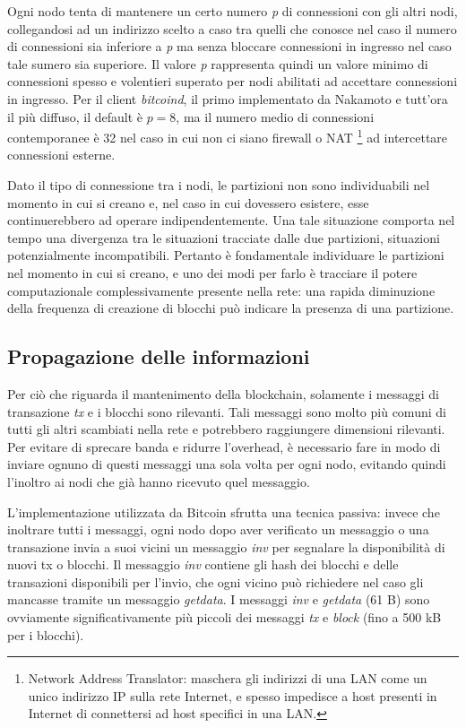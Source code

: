 Ogni nodo tenta di mantenere un certo numero \emph{p} di connessioni con gli altri nodi, collegandosi ad un indirizzo scelto a caso tra quelli che conosce nel caso il numero di connessioni sia inferiore a \emph{p} ma senza bloccare connessioni in ingresso nel caso tale sumero sia superiore. Il valore \emph{p} rappresenta quindi un valore minimo di connessioni spesso e volentieri superato per nodi abilitati ad accettare connessioni in ingresso. Per il client \emph{bitcoind}, il primo implementato da Nakamoto e tutt'ora il più diffuso, il default è $p=8$, ma il numero medio di connessioni contemporanee è 32 nel caso in cui non ci siano firewall o NAT \footnote{Network Address Translator: maschera   gli indirizzi di una LAN come un unico indirizzo IP sulla rete   Internet, e spesso impedisce a host presenti in Internet di   connettersi ad host specifici in una LAN.} ad intercettare connessioni esterne.

Dato il tipo di connessione tra i nodi, le partizioni non sono individuabili nel momento in cui si creano e, nel caso in cui dovessero esistere, esse continuerebbero ad operare indipendentemente. Una tale situazione comporta nel tempo una divergenza tra le situazioni tracciate dalle due partizioni, situazioni potenzialmente incompatibili. Pertanto è fondamentale individuare le partizioni nel momento in cui si creano, e uno dei modi per farlo è tracciare il potere computazionale complessivamente presente nella rete: una rapida diminuzione della frequenza di creazione di blocchi può indicare la presenza di una partizione.

\subsection{Propagazione delle informazioni}\label{propagazione-delle-informazioni}

Per ciò che riguarda il mantenimento della blockchain, solamente i messaggi di transazione \emph{tx} e i blocchi sono rilevanti. Tali messaggi sono molto più comuni di tutti gli altri scambiati nella rete e potrebbero raggiungere dimensioni rilevanti. Per evitare di sprecare banda e ridurre l'overhead, è necessario fare in modo di inviare ognuno di questi messaggi una sola volta per ogni nodo, evitando quindi l'inoltro ai nodi che già hanno ricevuto quel messaggio.

L'implementazione utilizzata da Bitcoin sfrutta una tecnica passiva: invece che inoltrare tutti i messaggi, ogni nodo dopo aver verificato un messaggio o una transazione invia a suoi vicini un messaggio \emph{inv} per segnalare la disponibilità di nuovi tx o blocchi. Il messaggio \emph{inv} contiene gli hash dei blocchi e delle transazioni disponibili per l'invio, che ogni vicino può richiedere nel caso gli mancasse tramite un messaggio \emph{getdata}. I messaggi \emph{inv} e \emph{getdata} (61 B) sono ovviamente significativamente più piccoli dei messaggi \emph{tx} e \emph{block} (fino a 500 kB per i blocchi).

